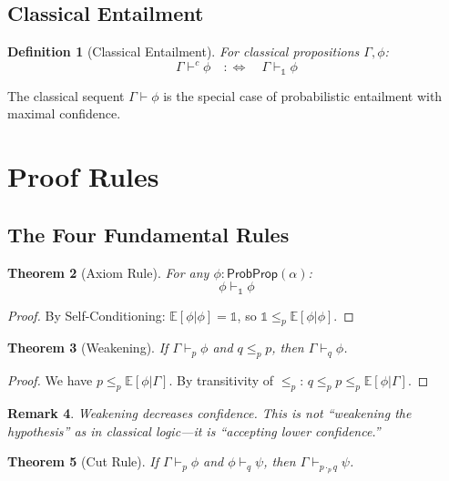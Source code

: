 \documentclass[11pt,a4paper]{article}
\newtheorem{theorem}{Theorem}[section]
\newtheorem{definition}[theorem]{Definition}
\newtheorem{remark}[theorem]{Remark}
\newcommand{\ProbProp}{\mathsf{ProbProp}}
\newcommand{\E}{\mathbb{E}}
\newcommand{\pone}{\mathbb{1}}
\newcommand{\ple}{\leq_p}
\newcommand{\pmul}{\cdot_p}
\newcommand{\entails}[1]{\vdash_{#1}}
\begin{document}
\subsection{Classical Entailment}

\begin{definition}[Classical Entailment]
For classical propositions $\Gamma, \phi$:
\[
\Gamma \vdash^c \phi \quad :\Leftrightarrow \quad \Gamma \entails{\pone} \phi
\]
\end{definition}

The classical sequent $\Gamma \vdash \phi$ is the special case of probabilistic entailment with maximal confidence.

\section{Proof Rules}

\subsection{The Four Fundamental Rules}

\begin{theorem}[Axiom Rule]
For any $\phi : \ProbProp(\alpha)$:
\[
\phi \entails{\pone} \phi
\]
\end{theorem}

\begin{proof}
By Self-Conditioning: $\E[\phi|\phi] = \pone$, so $\pone \ple \E[\phi|\phi]$.
\end{proof}

\begin{theorem}[Weakening]
If $\Gamma \entails{p} \phi$ and $q \ple p$, then $\Gamma \entails{q} \phi$.
\end{theorem}

\begin{proof}
We have $p \ple \E[\phi|\Gamma]$. By transitivity of $\ple$: $q \ple p \ple \E[\phi|\Gamma]$.
\end{proof}

\begin{remark}
Weakening \emph{decreases} confidence. This is not ``weakening the hypothesis'' as in classical logic---it is ``accepting lower confidence.''
\end{remark}

\begin{theorem}[Cut Rule]
If $\Gamma \entails{p} \phi$ and $\phi \entails{q} \psi$, then $\Gamma \entails{p \pmul q} \psi$.
\end{theorem}
\end{document}
